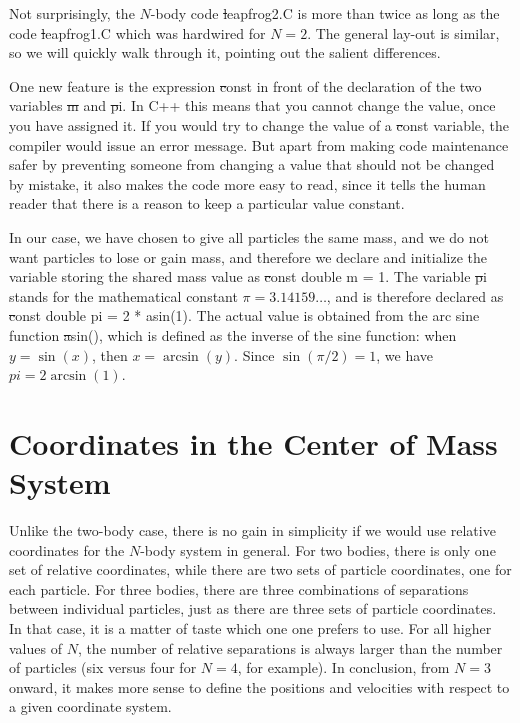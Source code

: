 Not surprisingly, the $N$-body code {\st leapfrog2.C} is more than
twice as long as the code {\st leapfrog1.C} which was hardwired for
$N=2$.  The general lay-out is similar, so we will quickly walk
through it, pointing out the salient differences.

One new feature is the expression {\st const} in front of the
declaration of the two variables {\st m} and {\st pi}.  In C++ this
means that you cannot change the value, once you have assigned it.  If
you would try to change the value of a {\st const} variable, the
compiler would issue an error message.  But apart from making code
maintenance safer by preventing someone from changing a value that
should not be changed by mistake, it also makes the code more easy to
read, since it tells the human reader that there is a reason to keep a
particular value constant.

In our case, we have chosen to give all particles the same mass, and
we do not want particles to lose or gain mass, and therefore we
declare and initialize the variable storing the shared mass value as
{\st const double m = 1}.  The variable {\st pi} stands for the
mathematical constant $\pi = 3.14159\dots$, and is therefore declared
as {\st const double pi = 2 * asin(1)}.  The actual value is obtained
from the arc sine function {\st asin()}, which is defined as the
inverse of the sine function: when $y = \sin(x)$, then $x=\arcsin(y)$.
Since $\sin(\pi/2)=1$, we have $pi = 2 \arcsin(1)$.

\section{Coordinates in the Center of Mass System}

Unlike the two-body case, there is no gain in simplicity if we would
use relative coordinates for the $N$-body system in general.  For two
bodies, there is only one set of relative coordinates, while there
are two sets of particle coordinates, one for each particle.  For
three bodies, there are three combinations of separations between
individual particles, just as there are three sets of particle
coordinates.  In that case, it is a matter of taste which one one
prefers to use.  For all higher values of $N$, the number of relative
separations is always larger than the number of particles (six versus
four for $N=4$, for example).  In conclusion, from $N=3$ onward,
it makes more sense to define the positions and velocities with
respect to a given coordinate system.

